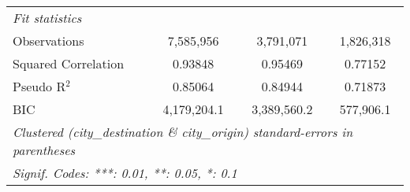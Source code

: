 \begin{tabular}{lccc}
   \midrule
   \emph{Fit statistics}\\
   Observations                                           & 7,585,956       & 3,791,071       & 1,826,318\\  
   Squared Correlation                                    & 0.93848         & 0.95469         & 0.77152\\  
   Pseudo R$^2$                                           & 0.85064         & 0.84944         & 0.71873\\  
   BIC                                                    & 4,179,204.1     & 3,389,560.2     & 577,906.1\\  
   \midrule \midrule
   \multicolumn{4}{l}{\emph{Clustered (city\_destination \& city\_origin) standard-errors in parentheses}}\\
   \multicolumn{4}{l}{\emph{Signif. Codes: ***: 0.01, **: 0.05, *: 0.1}}\\
\end{tabular}
\par\endgroup


